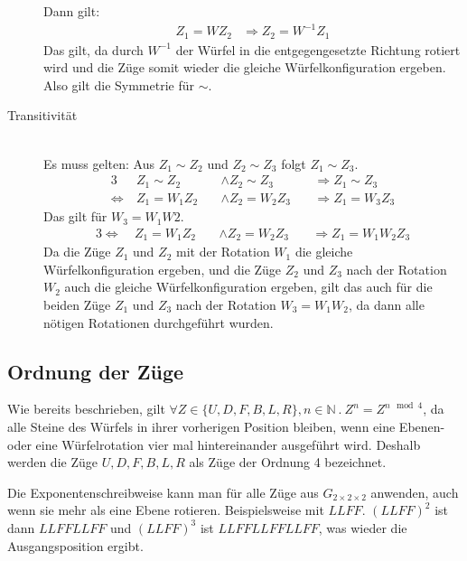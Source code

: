\documentclass[12pt,a4paper, usenames, dvipsnames]{article}
\newcommand{\Gtwo}{\ensuremath{G_{2\times 2\times 2}}}
\begin{document}
\begin{description}
Dann gilt: 
\begin{align*}
Z_1 = W Z_2 & \Rightarrow Z_2 = W^{-1} Z_1
\end{align*}
Das gilt, da durch $W^{-1}$ der Würfel in die entgegengesetzte Richtung rotiert wird und die Züge somit wieder die gleiche Würfelkonfiguration ergeben. \\
Also gilt die Symmetrie für $\sim$.


\item [Transitivität] \ \\
Es muss gelten: Aus $Z_1 \sim Z_2$ und $Z_2 \sim Z_3$ folgt $Z_1 \sim Z_3$.
\begin{alignat*}{3}
& Z_1 \sim Z_2 && \wedge Z_2 \sim Z_3 && \Rightarrow Z_1 \sim Z_3 \\
\Leftrightarrow \ & Z_1 = W_1Z_2 \ && \wedge Z_2 = W_2Z_3 \ && \Rightarrow Z_1 = W_3Z_3
\end{alignat*}
Das gilt für $W_3=W_1W2$.
\begin{alignat*}{3}
\Leftrightarrow \ & Z_1 = W_1Z_2 \ && \wedge Z_2 = W_2Z_3 \ && \Rightarrow Z_1 = W_1W_2Z_3 
\end{alignat*}
Da die Züge $Z_1$ und $Z_2$ mit der Rotation $W_1$ die gleiche Würfelkonfiguration ergeben, und die Züge $Z_2$ und $Z_3$ nach der Rotation $W_2$ auch die gleiche Würfelkonfiguration ergeben, gilt das auch für die beiden Züge $Z_1$ und $Z_3$ nach der Rotation $W_3=W_1W_2$, da dann alle nötigen Rotationen durchgeführt wurden.

\end{description}
%
%
%
%
%
%
%
%
%
%
%
%
%
%
%
%
%
%
%
%
\subsection*{Ordnung der Züge}
Wie bereits beschrieben, gilt $\forall Z \in \{ U, D, F, B, L, R \}, n \in \mathbb{N} \ . \ Z^n=Z^{n \mod 4}$, da alle Steine des Würfels in ihrer vorherigen Position bleiben, wenn eine Ebenen- oder eine Würfelrotation vier mal hintereinander ausgeführt wird. Deshalb werden die Züge $U, D, F, B, L, R$ als Züge der Ordnung 4 bezeichnet. 


Die Exponentenschreibweise kann man für alle Züge aus $\Gtwo$ anwenden, auch wenn sie mehr als eine Ebene rotieren. Beispielsweise mit $LLFF$. $(LLFF)^2$ ist dann $LLFFLLFF$ und $(LLFF)^3$ ist $LLFFLLFFLLFF$, was wieder die Ausgangsposition ergibt. 
\end{document}
